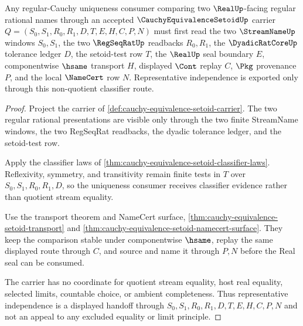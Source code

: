 \begin{theorem}
\label{thm:cauchy-equivalence-setoid-regular-cauchy-uniqueness-handoff}
Any regular-Cauchy uniqueness consumer comparing two $\RealUp$-facing regular rational names through an accepted $\CauchyEquivalenceSetoidUp$ carrier $Q=(S_0,S_1,R_0,R_1,D,T,E,H,C,P,N)$ must first read the two $\StreamNameUp$ windows $S_0,S_1$, the two $\RegSeqRatUp$ readbacks $R_0,R_1$, the $\DyadicRatCoreUp$ tolerance ledger $D$, the setoid-test row $T$, the $\RealUp$ seal boundary $E$, componentwise $\hsame$ transport $H$, displayed $\Cont$ replay $C$, $\Pkg$ provenance $P$, and the local $\NameCert$ row $N$. Representative independence is exported only through this non-quotient classifier route.
\end{theorem}
\begin{proof}
Project the carrier of \autoref{def:cauchy-equivalence-setoid-carrier}. The two regular rational presentations are visible only through the two finite StreamName windows, the two RegSeqRat readbacks, the dyadic tolerance ledger, and the setoid-test row.

Apply the classifier laws of \autoref{thm:cauchy-equivalence-setoid-classifier-laws}. Reflexivity, symmetry, and transitivity remain finite tests in $T$ over $S_0,S_1,R_0,R_1,D$, so the uniqueness consumer receives classifier evidence rather than quotient stream equality.

Use the transport theorem and NameCert surface, \autoref{thm:cauchy-equivalence-setoid-transport} and \autoref{thm:cauchy-equivalence-setoid-namecert-surface}. They keep the comparison stable under componentwise $\hsame$, replay the same displayed route through $C$, and source and name it through $P,N$ before the Real seal can be consumed.

The carrier has no coordinate for quotient stream equality, host real equality, selected limits, countable choice, or ambient completeness. Thus representative independence is a displayed handoff through $S_0,S_1,R_0,R_1,D,T,E,H,C,P,N$ and not an appeal to any excluded equality or limit principle.
\end{proof}

